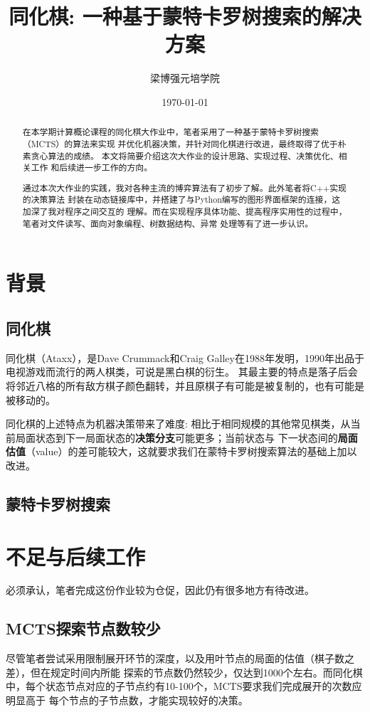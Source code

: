 \documentclass[12pt]{ctexart}
\begin{document}
	\title{同化棋: 一种基于蒙特卡罗树搜索的解决方案}
	\author{梁博强\quad 元培学院}
	\date{\today}
	\maketitle

	\begin{abstract}
		\normalsize
		在本学期计算概论课程的同化棋大作业中，笔者采用了一种基于蒙特卡罗树搜索（MCTS）的算法来实现
		并优化机器决策，并针对同化棋进行改进，最终取得了优于朴素贪心算法的成绩。
		本文将简要介绍这次大作业的设计思路、实现过程、决策优化、相关工作
		和后续进一步工作的方向。
		
		通过本次大作业的实践，我对各种主流的博弈算法有了初步了解。此外笔者将C++实现的决策算法
		封装在动态链接库中，并搭建了与Python编写的图形界面框架的连接，这加深了我对程序之间交互的
		理解。而在实现程序具体功能、提高程序实用性的过程中，笔者对文件读写、面向对象编程、树数据结构、异常
		处理等有了进一步认识。
	\end{abstract}

	\section{背景}

	\subsection{同化棋}
	同化棋（Ataxx），是Dave Crummack和Craig Galley在1988年发明，1990年出品于电视游戏而流行的两人棋类，可说是黑白棋的衍生。
	其最主要的特点是落子后会将邻近八格的所有敌方棋子颜色翻转，并且原棋子有可能是被复制的，也有可能是被移动的。

	同化棋的上述特点为机器决策带来了难度: 相比于相同规模的其他常见棋类，从当前局面状态到下一局面状态的\textbf{决策分支}可能更多；当前状态与
	下一状态间的\textbf{局面估值}（value）的差可能较大，这就要求我们在蒙特卡罗树搜索算法的基础上加以改进。

	\subsection{蒙特卡罗树搜索}

	\section{不足与后续工作}
	必须承认，笔者完成这份作业较为仓促，因此仍有很多地方有待改进。

	\subsection{MCTS探索节点数较少}
	尽管笔者尝试采用限制展开环节的深度，以及用叶节点的局面的估值（棋子数之差），但在规定时间内所能
	探索的节点数仍然较少，仅达到1000个左右。而同化棋中，每个状态节点对应的子节点约有10-100个，MCTS要求我们完成展开的次数应明显高于
	每个节点的子节点数，才能实现较好的决策。
\end{document}
